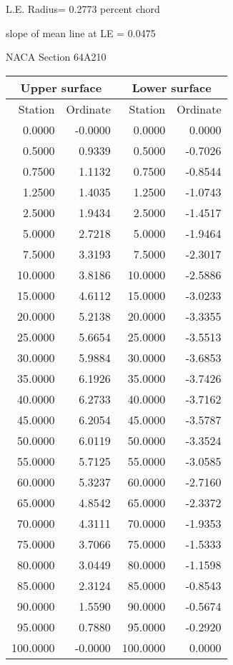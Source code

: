 \documentclass[11pt]{book}
\begin{document}
L.E. Radius=  0.2773 percent chord


 slope of mean line at LE =  0.0475
 \newpage
  \label{s64A210}
 \begin{Large}
 NACA Section 64A210
 \end{Large}
  
 \vspace{8mm}
 \begin{tabular}{|r|r|r|r|} \hline 
 \multicolumn{2}{|c|}{Upper surface} & \multicolumn{2}{|c|}{Lower surface} \\
 \hline
 Station & Ordinate & Station & Ordinate \\
 \hline
0.0000 & -0.0000 & 0.0000 & 0.0000 \\
0.5000 & 0.9339 & 0.5000 & -0.7026 \\
0.7500 & 1.1132 & 0.7500 & -0.8544 \\
1.2500 & 1.4035 & 1.2500 & -1.0743 \\
2.5000 & 1.9434 & 2.5000 & -1.4517 \\
5.0000 & 2.7218 & 5.0000 & -1.9464 \\
7.5000 & 3.3193 & 7.5000 & -2.3017 \\
10.0000 & 3.8186 & 10.0000 & -2.5886 \\
15.0000 & 4.6112 & 15.0000 & -3.0233 \\
20.0000 & 5.2138 & 20.0000 & -3.3355 \\
25.0000 & 5.6654 & 25.0000 & -3.5513 \\
30.0000 & 5.9884 & 30.0000 & -3.6853 \\
35.0000 & 6.1926 & 35.0000 & -3.7426 \\
40.0000 & 6.2733 & 40.0000 & -3.7162 \\
45.0000 & 6.2054 & 45.0000 & -3.5787 \\
50.0000 & 6.0119 & 50.0000 & -3.3524 \\
55.0000 & 5.7125 & 55.0000 & -3.0585 \\
60.0000 & 5.3237 & 60.0000 & -2.7160 \\
65.0000 & 4.8542 & 65.0000 & -2.3372 \\
70.0000 & 4.3111 & 70.0000 & -1.9353 \\
75.0000 & 3.7066 & 75.0000 & -1.5333 \\
80.0000 & 3.0449 & 80.0000 & -1.1598 \\
85.0000 & 2.3124 & 85.0000 & -0.8543 \\
90.0000 & 1.5590 & 90.0000 & -0.5674 \\
95.0000 & 0.7880 & 95.0000 & -0.2920 \\
100.0000 & -0.0000 & 100.0000 & 0.0000 \\
 \hline 
 \end{tabular}
\end{document}

